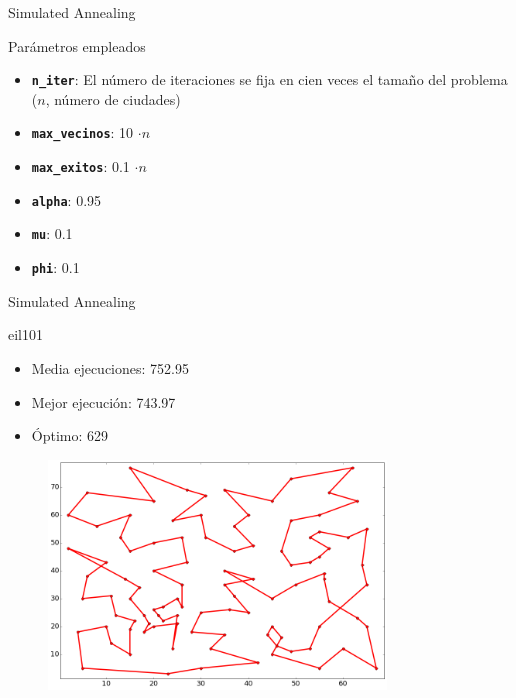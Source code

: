\documentclass[ignorenonframetext,]{beamer}
\begin{document}
\begin{frame}{Simulated Annealing}

\begin{block}{Parámetros empleados}

\begin{itemize}
\item
  \textbf{\texttt{n\_iter}}: El número de iteraciones se fija en cien
  veces el tamaño del problema ($n$, número de ciudades)
\item
  \textbf{\texttt{max\_vecinos}}: 10 $\cdot n$
\item
  \textbf{\texttt{max\_exitos}}: 0.1 $\cdot n$
\item
  \textbf{\texttt{alpha}}: 0.95
\item
  \textbf{\texttt{mu}}: 0.1
\item
  \textbf{\texttt{phi}}: 0.1
\end{itemize}

\end{block}

\end{frame}

\begin{frame}{Simulated Annealing}

\begin{block}{eil101}

\begin{itemize}
\item
  Media ejecuciones: 752.95
\item
  Mejor ejecución: 743.97
\item
  Óptimo: 629
\end{itemize}

\begin{figure}[htbp]
\centering
\includegraphics[width=0.8\textwidth]{./images/eil101sa.png}
\end{figure}

\end{block}

\end{frame}
\end{document}
